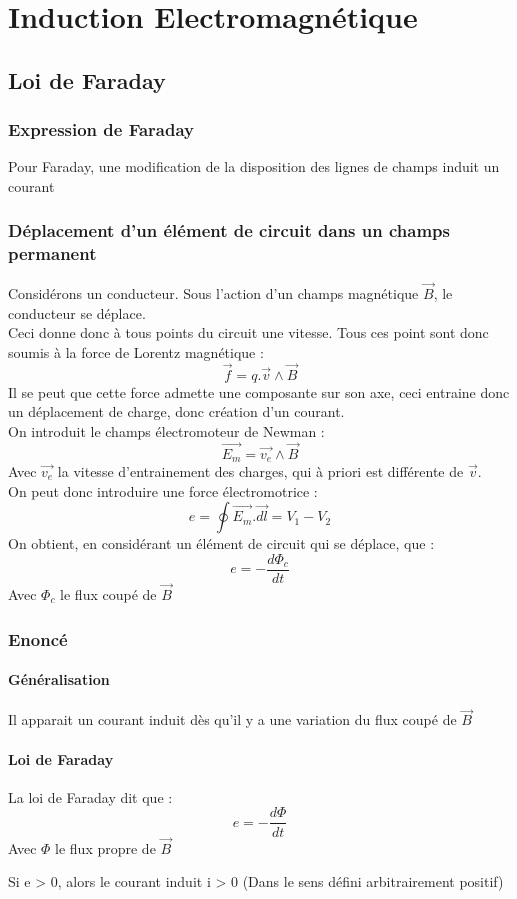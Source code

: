 
\chapter{Induction Electromagnétique}
\section{Loi de Faraday}
\subsection{Expression de Faraday}
Pour Faraday, une modification de la disposition des lignes de champs induit un courant
\subsection{Déplacement d'un élément de circuit dans un champs permanent}
Considérons un conducteur. Sous l'action d'un champs magnétique $\overrightarrow{B}$, le conducteur se déplace.\\ Ceci donne donc à tous points du circuit une vitesse. Tous ces point sont donc soumis à la force de Lorentz magnétique : 
$$\overrightarrow{f} = q.\overrightarrow{v}\wedge\overrightarrow{B}$$
Il se peut que cette force admette une composante sur son axe, ceci entraine donc un déplacement de charge, donc création d'un courant.\\
On introduit le champs électromoteur de Newman : 
$$\overrightarrow{E_{m}} = \overrightarrow{v_e}\wedge\overrightarrow{B}$$
Avec $\overrightarrow{v_e}$ la vitesse d'entrainement des charges, qui à priori est différente de $\overrightarrow{v}$.\\
On peut donc introduire une force électromotrice : 
$$e = \oint \overrightarrow{E_m}.\overrightarrow{dl} = V_1-V_2$$
On obtient, en considérant un élément de circuit qui se déplace, que : 
$$e = -\dfrac{d\Phi_c}{dt}$$
Avec $\Phi_c$ le flux coupé de $\overrightarrow{B}$
\subsection{Enoncé}
\subsubsection{Généralisation}
Il apparait un courant induit dès qu'il y a une variation du flux coupé de $\overrightarrow{B}$
\subsubsection{Loi de Faraday}
La loi de Faraday dit que : 
$$e = -\dfrac{d\Phi}{dt}$$
Avec $\Phi$ le flux propre de $\overrightarrow{B}$
\begin{prop}
Si e > 0, alors le courant induit i > 0 (Dans le sens défini arbitrairement positif)
\end{prop}

